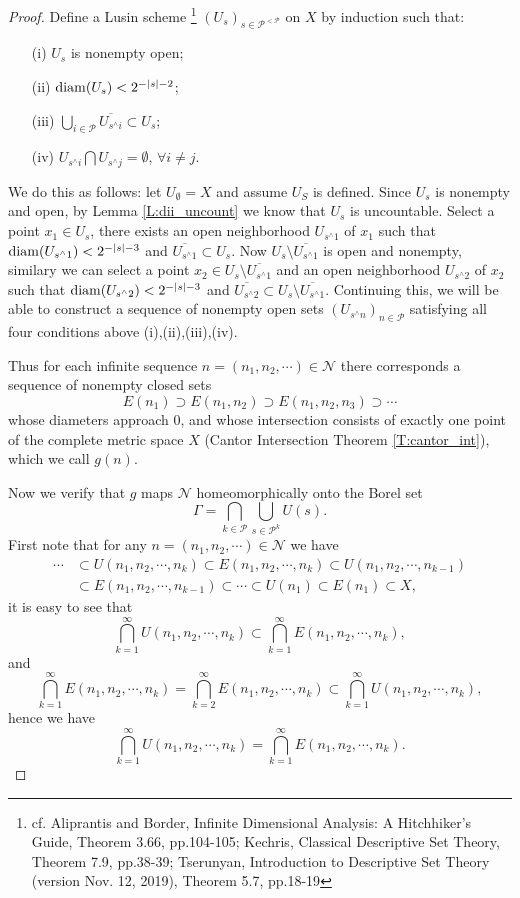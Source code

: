 \begin{proof}
Define a Lusin scheme 
\footnote{cf. Aliprantis and Border, Infinite Dimensional Analysis: A 
  Hitchhiker's Guide, Theorem 3.66, pp.104-105;
  Kechris, Classical Descriptive Set Theory, Theorem 7.9, pp.38-39;
  Tserunyan, Introduction to Descriptive Set Theory (version Nov. 12, 2019), 
  Theorem 5.7, pp.18-19
}
$(U_s)_{s\in \mathcal{P}^{<\mathcal{P}}}$ on $X$ by 
induction such that:
\begin{enumerate}
  \item[(i)] $U_s$ is nonempty open;
  \item[(ii)] $\operatorname*{diam}(U_s)<2^{-|s|-2}$;
  \item[(iii)] $\bigcup_{i\in\mathcal{P}} \overline{U_{s^\wedge i}}
                \subset U_s$;
  \item[(iv)] $U_{s^\wedge i}\bigcap U_{s^\wedge j}=\emptyset$, 
              $\forall i\neq j$.
\end{enumerate}
We do this as follows: let $U_{\emptyset}=X$ and assume $U_S$ is defined. Since
$U_s$ is nonempty and open, by Lemma \ref{L:dii_uncount} we know that $U_s$ is
uncountable. Select a point $x_1\in U_s$, there exists an open neighborhood 
$U_{s^\wedge 1}$ of $x_1$ such that $\operatorname*{diam}(U_{s^\wedge 1})<2^{-|s|-3}$ and 
$\overline{U_{s^\wedge 1}}\subset U_s$. 
Now $U_s\setminus \overline{U_{s^\wedge 1}}$ is open and nonempty, similary we
can select a point $x_2\in U_s\setminus \overline{U_{s^\wedge 1}}$ and an open
neighborhood $U_{s^\wedge 2}$ of $x_2$ such that 
$\operatorname*{diam}(U_{s^\wedge 2})<2^{-|s|-3}$ and 
$\overline{U_{s^\wedge 2}}\subset U_s\setminus\overline{U_{s^\wedge 1}}$. 
Continuing this, we will be able to construct a sequence of nonempty open sets
$(U_{s^\wedge n})_{n\in\mathcal{P}}$ satisfying all four conditions above
(i),(ii),(iii),(iv).

Thus for each infinite sequence $n=(n_1,n_2,\cdots)\in\mathcal{N}$ there
corresponds a sequence of nonempty closed sets
\[
  E(n_1)\supset E(n_1,n_2) \supset E(n_1,n_2,n_3) \supset \cdots
\]
whose diameters approach $0$, and whose intersection consists of exactly one
point of the complete metric space $X$ (Cantor Intersection Theorem 
\ref{T:cantor_int}), which we call $g(n)$.

Now we verify that $g$ maps $\mathcal{N}$ homeomorphically onto the Borel set
\[
	\Gamma = \bigcap_{k\in\mathcal{P}} \bigcup_{s\in\mathcal{P}^k} U(s).
\]
First note that for any $n=(n_1,n_2,\cdots)\in\mathcal{N}$ we have
\begin{align*}
	\cdots 
	&\subset U(n_1,n_2,\cdots,n_k) \subset E(n_1,n_2,\cdots,n_k)
  	\subset U(n_1,n_2,\cdots,n_{k-1})  \\
	&\subset E(n_1,n_2,\cdots,n_{k-1})
  	\subset \cdots \subset U(n_1) \subset E(n_1) \subset X,
\end{align*}
it is easy to see that 
\[
	\bigcap_{k=1}^{\infty} U(n_1,n_2,\cdots,n_k) 
	  \subset \bigcap_{k=1}^{\infty} E(n_1,n_2,\cdots,n_k),
\]
and
\[
	\bigcap_{k=1}^{\infty} E(n_1,n_2,\cdots,n_k)
	= \bigcap_{k=2}^{\infty} E(n_1,n_2,\cdots,n_k)
	\subset \bigcap_{k=1}^{\infty} U(n_1,n_2,\cdots,n_k),
\]
hence we have
\[
	\bigcap_{k=1}^{\infty} U(n_1,n_2,\cdots,n_k) 
	= \bigcap_{k=1}^{\infty} E(n_1,n_2,\cdots,n_k).
\]


\end{proof}
